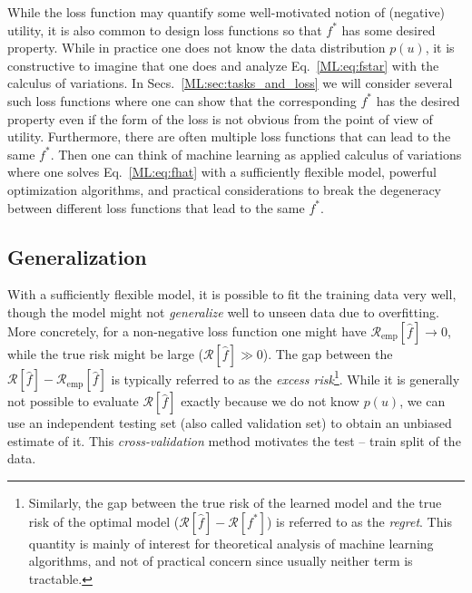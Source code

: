 
While the loss function may quantify some well-motivated notion of (negative) utility, it is also common to design loss functions so that $f^*$ has some desired property. While in practice one does not know the data distribution $p(u)$, it is constructive to imagine that one does and analyze Eq.~\ref{ML:eq:fstar} with the calculus of variations. In Secs.~\ref{ML:sec:tasks_and_loss} we will consider several such loss functions where one can show that the corresponding $f^*$ has the desired property even if the form of the loss is not obvious from the point of view of utility. Furthermore, there are often multiple loss functions that can lead to the same $f^*$. Then one can think of machine learning as applied calculus of variations where one solves Eq.~\ref{ML:eq:fhat} with a sufficiently flexible model, powerful optimization algorithms, and practical considerations to break the degeneracy between different loss functions that lead to the same $f^*$. 

\subsection{Generalization}

With a sufficiently flexible model, it is possible to fit the training data very well, though the model might not \textit{generalize} well to unseen data due to overfitting. More concretely, for a non-negative loss function one might have $\mathcal{R}_\textrm{emp}[\hat{f}] \to 0$, while the true risk might be large ($\mathcal{R}[\hat{f}] \gg 0$). The gap between the $\mathcal{R}[\hat{f}]-\mathcal{R}_\textrm{emp}[\hat{f}]$ is typically referred to as the \textit{excess risk}\footnote{Similarly, the gap between the true risk of the learned model and the true risk of the optimal model (\ie $\mathcal{R}[\hat{f}]-\mathcal{R}[f^*]$) is referred to as the \textit{regret}. This quantity is mainly of interest for theoretical analysis of machine learning algorithms, and not of practical concern since usually neither term is tractable.}. While it is generally not possible to evaluate $\mathcal{R}[\hat{f}]$ exactly because we do not know $p(u)$, we can use an independent testing set (also called validation set) to obtain an unbiased estimate of it. This \textit{cross-validation} method motivates the test -- train split of the data. 


